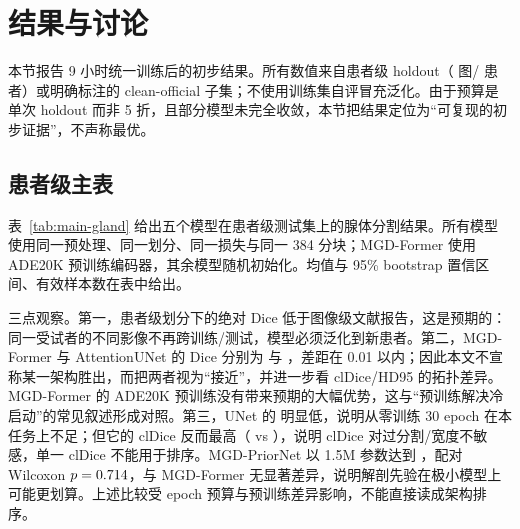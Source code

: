 \section{结果与讨论}\label{sec:results}

本节报告 9 小时统一训练后的初步结果。所有数值来自患者级 holdout（\nTest{} 图/\nTestPatients{} 患者）或明确标注的 clean-official 子集；不使用训练集自评冒充泛化。由于预算是单次 holdout 而非 5 折，且部分模型未完全收敛，本节把结果定位为“可复现的初步证据”，不声称最优。

\subsection{患者级主表}

表~\ref{tab:main-gland} 给出五个模型在患者级测试集上的腺体分割结果。所有模型使用同一预处理、同一划分、同一损失与同一 384 分块；MGD-Former 使用 ADE20K 预训练编码器，其余模型随机初始化。均值与 95\% bootstrap 置信区间、有效样本数在表中给出。

\begin{table}[t]
\centering
\caption{患者级测试集上的腺体分割（均值；括号内为 95\% bootstrap CI；$n=\nTest$）。}
\label{tab:main-gland}
\small
{}
\end{table}

三点观察。第一，患者级划分下的绝对 Dice 低于图像级文献报告，这是预期的：同一受试者的不同影像不再跨训练/测试，模型必须泛化到新患者。第二，MGD-Former 与 AttentionUNet 的 Dice 分别为 \gDiceMF{} 与 \gDiceAtt{}，差距在 0.01 以内；因此本文不宣称某一架构胜出，而把两者视为“接近”，并进一步看 clDice/HD95 的拓扑差异。MGD-Former 的 ADE20K 预训练没有带来预期的大幅优势，这与“预训练解决冷启动”的常见叙述形成对照。第三，UNet 的 \gDiceUNet{} 明显低，说明从零训练 30 epoch 在本任务上不足；但它的 clDice 反而最高（\gClDiceUNet{} vs \gClDiceMF{}），说明 clDice 对过分割/宽度不敏感，单一 clDice 不能用于排序。MGD-PriorNet 以 1.5M 参数达到 \gDicePrior{}，配对 Wilcoxon $p=0.714$，与 MGD-Former 无显著差异，说明解剖先验在极小模型上可能更划算。上述比较受 epoch 预算与预训练差异影响，不能直接读成架构排序。

